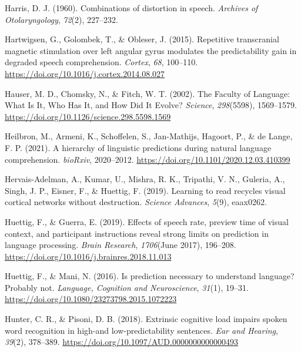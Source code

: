 \documentclass[a4paper, nobind]{templates/ociamthesis}
\newlength{\cslhangindent}
\newenvironment{CSLReferences}[2] %
 {%
  \setlength{\parindent}{0pt}
  \ifodd #1
  \let\oldpar\par
  \def\par{\hangindent=\cslhangindent\oldpar}
  \fi
  \setlength{\parskip}{1mm}
  \setlength{\baselineskip}{6mm}
 }%
 {}
\begin{document}
\begin{CSLReferences}{1}{0}
\leavevmode{}%
Harris, D. J. (1960). {Combinations of distortion in speech}. \emph{Archives of Otolaryngology}, \emph{72}(2), 227--232.

\leavevmode{}%
Hartwigsen, G., Golombek, T., \& Obleser, J. (2015). Repetitive transcranial magnetic stimulation over left angular gyrus modulates the predictability gain in degraded speech comprehension. \emph{Cortex}, \emph{68}, 100--110. \url{https://doi.org/10.1016/j.cortex.2014.08.027}

\leavevmode{}%
Hauser, M. D., Chomsky, N., \& Fitch, W. T. (2002). The Faculty of Language: What Is It, Who Has It, and How Did It Evolve? \emph{Science}, \emph{298}(5598), 1569--1579. \url{https://doi.org/10.1126/science.298.5598.1569}

\leavevmode{}%
Heilbron, M., Armeni, K., Schoffelen, S., Jan-Mathijs, Hagoort, P., \& de Lange, F. P. (2021). {A hierarchy of linguistic predictions during natural language comprehension}. \emph{bioRxiv}, 2020--2012. \url{https://doi.org/10.1101/2020.12.03.410399}

\leavevmode{}%
Hervais-Adelman, A., Kumar, U., Mishra, R. K., Tripathi, V. N., Guleria, A., Singh, J. P., Eisner, F., \& Huettig, F. (2019). Learning to read recycles visual cortical networks without destruction. \emph{Science Advances}, \emph{5}(9), eaax0262.

\leavevmode{}%
Huettig, F., \& Guerra, E. (2019). {Effects of speech rate, preview time of visual context, and participant instructions reveal strong limits on prediction in language processing}. \emph{Brain Research}, \emph{1706}(June 2017), 196--208. \url{https://doi.org/10.1016/j.brainres.2018.11.013}

\leavevmode{}%
Huettig, F., \& Mani, N. (2016). Is prediction necessary to understand language? Probably not. \emph{Language, Cognition and Neuroscience}, \emph{31}(1), 19--31. \url{https://doi.org/10.1080/23273798.2015.1072223}

\leavevmode{}%
Hunter, C. R., \& Pisoni, D. B. (2018). {Extrinsic cognitive load impairs spoken word recognition in high-and low-predictability sentences}. \emph{Ear and Hearing}, \emph{39}(2), 378--389. \url{https://doi.org/10.1097/AUD.0000000000000493}


\end{CSLReferences}
\end{document}
